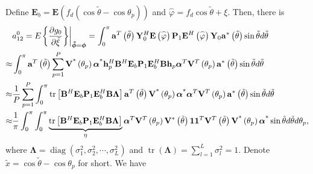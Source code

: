\documentclass[12pt, draftclsnofoot, onecolumn]{IEEEtran}
\begin{document}
Define ${{\mathbf{E}}_{b}}=\mathbf{E}\left( {{f}_{d}}\left( \cos \tilde{\theta }-\cos {{\theta }_{p}} \right) \right)$ and $\overset{\scriptscriptstyle\frown}{\varphi }={{f}_{d}}\cos \tilde{\theta }+\xi $. Then, there is
\begin{align}\label{a120_intermed}
  & a_{12}^{0} = {E{\left. \left\{ \frac{\partial {{g}_{0}}}{\partial \tilde{\xi }} \right\} \right|}_{ \boldsymbol{\tilde{\phi}} = \boldsymbol{\phi} }} = \int_{0}^{\rm{\pi}}{{\mathbf{a}}^{T}}\left( {\tilde{\theta }} \right)\mathbf{Y}_{0}^{H}\mathbf{E}\left( {\overset{\scriptscriptstyle\frown}{\varphi }} \right) \mathbf{P}_{1} {{\mathbf{E}}^{H}}\left( {\overset{\scriptscriptstyle\frown}{\varphi }} \right){{\mathbf{Y}}_{0}}{{\mathbf{a}}^{*}}\left( {\tilde{\theta }} \right)\sin \tilde{\theta }d\tilde{\theta } \nonumber \\
\approx & \int_{0}^{\rm{\pi}}{{\mathbf{a}}^{T}}\left( {\tilde{\theta }} \right)\sum\limits_{p=1}^{P}{{\mathbf{V}}^{\text{*}}}\left( {{\theta }_{p}} \right){{\boldsymbol{\alpha }}^{\text{*}}}\mathbf{h}_{p}^{H}{{\mathbf{B}}^{H}}{{\mathbf{E}}_{b}} \mathbf{P}_{1} \mathbf{E}_{b}^{H}\mathbf{B}{{\mathbf{h}}_{p}}{{\boldsymbol{\alpha }}^{T}}{{\mathbf{V}}^{T}}\left( {{\theta }_{p}} \right){{\mathbf{a}}^{*}}\left( {\tilde{\theta }} \right)\sin \tilde{\theta }d\tilde{\theta } \nonumber \\
\approx & \frac{1}{P}\sum\limits_{p=1}^{P}\int_{0}^{\rm{\pi}}\operatorname{tr}\left[ {{\mathbf{B}}^{H}}{{\mathbf{E}}_{b}} \mathbf{P}_{1} \mathbf{E}_{b}^{H}\mathbf{B} \mathbf{\Lambda} \right] {{\mathbf{a}}^{T}}\left( {\tilde{\theta }} \right){{\mathbf{V}}^{\text{*}}}\left( {{\theta }_{p}} \right){{\boldsymbol{\alpha }}^{\text{*}}}{{\boldsymbol{\alpha }}^{T}}{{\mathbf{V}}^{T}}\left( {{\theta }_{p}} \right){{\mathbf{a}}^{*}}\left( {\tilde{\theta }} \right)\sin \tilde{\theta }d\tilde{\theta } \nonumber \\
\approx & \frac{1}{{\rm{\pi}}}\int_{0}^{\rm{\pi}}\int_{0}^{\rm{\pi}} \underbrace{\operatorname{tr}\left[ {{\mathbf{B}}^{H}}{{\mathbf{E}}_{b}} {\mathbf{P}_{1}} \mathbf{E}_{b}^{H}\mathbf{B}\mathbf{\Lambda} \right]}_{\eta } {{\boldsymbol{\alpha }}^{T}}{{\mathbf{V}}^{T}}\left( {{\theta }_{p}} \right){{\mathbf{V}}^{*}}\left( {\tilde{\theta }} \right)\mathbf{1} {{\mathbf{1}}^{T}}{{\mathbf{V}}^{T}}\left( {\tilde{\theta }} \right){{\mathbf{V}}^{\text{*}}}\left( {{\theta }_{p}} \right){{\boldsymbol{\alpha }}^{\text{*}}} \sin \tilde{\theta }d\tilde{\theta }d{{\theta }_{p}},
\end{align}
where $\mathbf{\Lambda} = \operatorname{diag}\left( \sigma_{1}^{2}, \sigma_{2}^{2}, \cdots\!, \sigma_{L}^{2} \right)$ and $\operatorname{tr}\left( \mathbf{\Lambda} \right) = \sum \nolimits_{l=1}^{L} {\sigma_{l}^{2}} = 1$. Denote $\tilde{x}=\cos \tilde{\theta }-\cos {{\theta }_{p}}$ for short. We have
\end{document}
